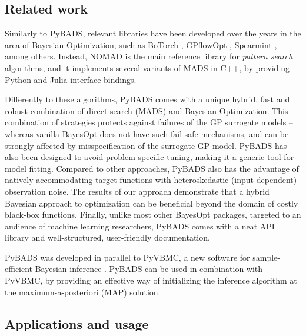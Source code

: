 \documentclass[
]{article}
\begin{document}
\hypertarget{related-work}{%
\subsection{Related work}\label{related-work}}

Similarly to PyBADS, relevant libraries have been developed over the years in the area of Bayesian Optimization, such as BoTorch \parencite{balandat2020botorch},  GPflowOpt \parencite{GPflowOpt2017}, Spearmint \parencite{pmlr-v32-snoek14}, among others. Instead, NOMAD \parencite{nomad4paper} is the main reference library for \textit{pattern search} algorithms, and it implements several variants of MADS in C++, by providing Python and Julia interface bindings.

Differently to these algorithms, PyBADS comes with a unique hybrid, fast and robust combination of direct search (MADS) and Bayesian Optimization. This combination of strategies protects against failures of the GP surrogate models – whereas vanilla BayesOpt does not have such fail-safe mechanisms, and can be strongly affected by misspecification of the surrogate GP model. PyBADS has also been designed to avoid problem-specific tuning, making it a generic tool for model fitting. Compared to other approaches, PyBADS also has the advantage of natively accommodating  target functions with heteroskedastic (input-dependent) observation noise. The results of our approach demonstrate that a hybrid Bayesian approach to optimization can be beneficial beyond the domain of costly black-box functions.
Finally, unlike most other BayesOpt packages, targeted to an audience of machine learning researchers, PyBADS comes with a neat API library and well-structured, user-friendly documentation.

PyBADS was developed in parallel to PyVBMC, a new software for sample-efficient Bayesian inference \parencite{huggins2023pyvbmc, acerbi2018variational, acerbi2020variational, acerbi2019exploration}. PyBADS can be used in combination with PyVBMC, by providing an effective way of initializing the inference algorithm at the maximum-a-posteriori (MAP) solution.

\hypertarget{applications-and-usage}{%
\subsection{Applications and usage}\label{applications-and-usage}}
\end{document}
